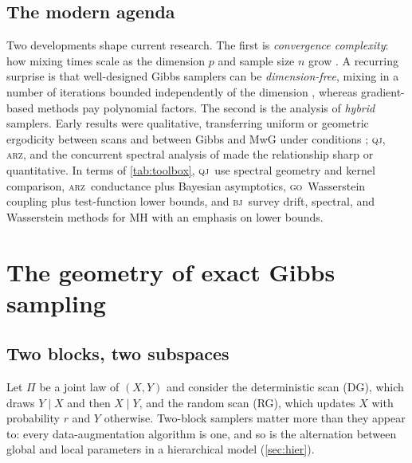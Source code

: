 \documentclass[11pt]{article}
\theoremstyle{remark}
\newcommand{\QJ}{\textsc{qj}}
\newcommand{\ARZ}{\textsc{arz}}
\newcommand{\GO}{\textsc{go}}
\newcommand{\BJ}{\textsc{bj}}
\begin{document}
\subsection{The modern agenda}
Two developments shape current research. The first is \emph{convergence complexity}: how mixing times scale as the dimension $p$ and sample size $n$ grow \citep{rajaratnam2015,qin2019convergence}. A recurring surprise is that well-designed Gibbs samplers can be \emph{dimension-free}, mixing in a number of iterations bounded independently of the dimension \citep{jin2022dimension,ascolani2024dimension}, whereas gradient-based methods pay polynomial factors. The second is the analysis of \emph{hybrid} samplers. Early results were qualitative, transferring uniform or geometric ergodicity between scans and between Gibbs and MwG under conditions \citep{roberts1997geometric,fort2003,jones2014conditional}; \QJ, \ARZ, and the concurrent spectral analysis of \citet{qin2025spectral} made the relationship sharp or quantitative. In terms of \cref{tab:toolbox}, \QJ\ use spectral geometry and kernel comparison, \ARZ\ conductance plus Bayesian asymptotics, \GO\ Wasserstein coupling plus test-function lower bounds, and \BJ\ survey drift, spectral, and Wasserstein methods for MH with an emphasis on lower bounds.

\section{The geometry of exact Gibbs sampling}\label{sec:gibbs}

\subsection{Two blocks, two subspaces}
Let $\Pi$ be a joint law of $(X,Y)$ and consider the deterministic scan (DG), which draws $Y\mid X$ and then $X\mid Y$, and the random scan (RG), which updates $X$ with probability $r$ and $Y$ otherwise. Two-block samplers matter more than they appear to: every data-augmentation algorithm is one, and so is the alternation between global and local parameters in a hierarchical model (\cref{sec:hier}).
\end{document}

